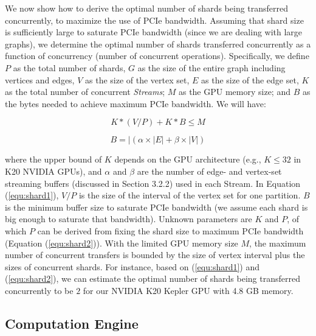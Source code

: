 We now show how to derive the optimal number of shards being transferred concurrently, to maximize the use of PCIe bandwidth. 
Assuming that shard size is sufficiently large to saturate PCIe bandwidth (since we are dealing with large graphs),
we determine the optimal number of shards transferred concurrently as a function of concurrency (number of concurrent operations). 
Specifically, we define $P$ as the total number of shards, $G$ as the size of the entire graph including vertices and edges, 
$V$ as the size of the vertex set, $E$ as the size of the edge set, $K$ as the total number of concurrent \textit{Streams}; 
$M$ as the GPU memory size; and $B$ as the bytes needed to achieve maximum PCIe bandwidth. We will have: 


\vspace{-6pt}
{%
\begin{equation}
\label{equ:shard1}
K*(V/P) + K*B \leq M 
\end{equation}}

\vspace{-14pt}
{%
\begin{equation}
\label{equ:shard2}
B =|(\alpha \times |E|+\beta \times |V|)   
\end{equation}}


where the upper bound of $K$ depends on the GPU architecture (e.g., $K\leq 32$ in K20 NVIDIA GPUs), and $\alpha$ and $\beta$ 
are the number of edge- and vertex-set streaming buffers (discussed in Section 3.2.2) used in each Stream. In Equation (\ref{equ:shard1}), $V/P$ is the size of the interval of the vertex set for one partition. $B$ is the minimum buffer size to saturate PCIe bandwidth (we assume each shard is big enough to saturate that bandwidth). Unknown parameters are $K$ and $P$, of which $P$ can be derived from fixing the shard size to maximum PCIe bandwidth (Equation (\ref{equ:shard2})). With the limited GPU memory size $M$, the maximum number of concurrent transfers is bounded by the size of vertex interval plus the sizes of concurrent shards. For instance, based 
on (\ref{equ:shard1}) and (\ref{equ:shard2}), we can estimate the optimal number of shards being transferred concurrently to be 
$2$ for our NVIDIA K20 Kepler GPU with 4.8 GB memory.





\subsection{Computation Engine}
\label{computation}


